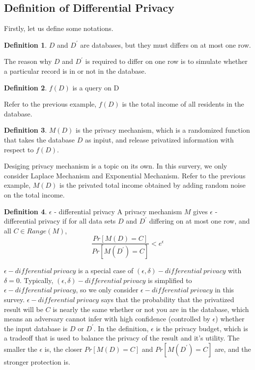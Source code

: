 \documentclass[a4paper, 11pt]{article} %
\theoremstyle{definition}
\newtheorem{definition}{Definition}[section]
\begin{document}
\subsection{Definition of Differential Privacy}
Firstly, let us define some notations.
\theoremstyle{definition}
\begin{definition}{}
 $D$ and $D^\prime$ are databases, but they must differs on at most one row. 
\end{definition}
The reason why $D$ and $D^\prime$ is required to differ on one row is to simulate whether a particular record is in or not in the database.
\begin{definition}{}
$f(D)$ is a query on D
\end{definition}
Refer to the previous example, $f(D)$ is the total income of all residents in the database.
\begin{definition}{}
	$M(D)$ is the privacy mechanism, which is a randomized function that takes the database $D$ as inpiut, and release privatized information with respect to $f(D)$.
\end{definition}
Desiging privacy mechanism is a topic on its own\cite{mcsherry2007mechanism}. In this survery, we only consider Laplace Mechanism and Exponential Mechanism. Refer to the previous example, $M(D)$ is the privated total income obtained by adding random noise on the total income.
\begin{definition}{$\epsilon$ - differential privacy}
	A privacy mechanism $M$ gives $\epsilon$ - differential privacy if for all data sets $D$ and $D^\prime$ differing on at most one row, and all $C\in Range(M)$,
	\[  \frac{Pr[M(D) = C]}{Pr[M(D^\prime) = C]}< e^\epsilon \]
\end{definition}
$\epsilon - differential \ privacy$ is a special case of $(\epsilon,\delta) - differential \ privacy$\cite{dwork2011differential,dwork2006our} with $\delta = 0$. Typically, $(\epsilon,\delta) - differential \ privacy$ is simplified to $\epsilon - differential \ privacy$, so we only consider $\epsilon - differential \ privacy$ in this survey. $\epsilon - differential \ privacy$ says that the probability that the privatized result will be $C$ is nearly the same whether or not you are in the database, which means an adversary cannot infer with high confidence (controlled by $\epsilon$) whether the input database is $D$ or $D^\prime$. In the definition, $\epsilon$ is the privacy budget, which is a tradeoff that is used to balance the privacy of the result and it's utility. The smaller the $\epsilon$ is, the closer $Pr[M(D) = C]$ and $Pr[M(D^\prime) = C]$ are, and the stronger protection is. 
\end{document}

